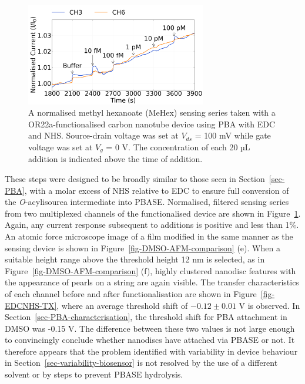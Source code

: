 \documentclass[
  a4paper,
]{scrbook}
\begin{document}
\begin{figure}

{\centering \includegraphics[width=0.7\textwidth,height=\textheight]{figures/ch7/NTQ25D3_OR22a_sample_220218_EDCNHS.png}

}

\caption[A normalised methyl hexanoate (MeHex) sensing series taken with
a OR22a-functionalised carbon nanotube device using PBA with EDC and
NHS.]{\label{fig-EDCNHS-sensing}A normalised methyl hexanoate (MeHex)
sensing series taken with a OR22a-functionalised carbon nanotube device
using PBA with EDC and NHS. Source-drain voltage was set at \(V_{ds}\) =
100 mV while gate voltage was set at \(V_g\) = 0 V. The concentration of
each 20 µL addition is indicated above the time of addition.}

\end{figure}

These steps were designed to be broadly similar to those seen in
Section~\ref{sec-PBA}, with a molar excess of NHS relative to EDC to
ensure full conversion of the \emph{O}-acylisourea intermediate into
PBASE. Normalised, filtered sensing series from two multiplexed channels
of the functionalised device are shown in
Figure~\ref{fig-EDCNHS-sensing}. Again, any current response subsequent
to additions is positive and less than 1\%. An atomic force microscope
image of a film modified in the same manner as the sensing device is
shown in Figure~\ref{fig-DMSO-AFM-comparison} (e). When a suitable
height range above the threshold height 12 nm is selected, as in
Figure~\ref{fig-DMSO-AFM-comparison} (f), highly clustered nanodisc
features with the appearance of pearls on a string are again visible.
The transfer characteristics of each channel before and after
functionalisation are shown in Figure~\ref{fig-EDCNHS-TX}, where an
average threshold shift of \(-0.12 \pm 0.01\) V is observed. In
Section~\ref{sec-PBA-characterisation}, the threshold shift for PBA
attachment in DMSO was -0.15 V. The difference between these two values
is not large enough to convincingly conclude whether nanodiscs have
attached via PBASE or not. It therefore appears that the problem
identified with variability in device behaviour in
Section~\ref{sec-variability-biosensor} is not resolved by the use of a
different solvent or by steps to prevent PBASE hydrolysis.
\end{document}
